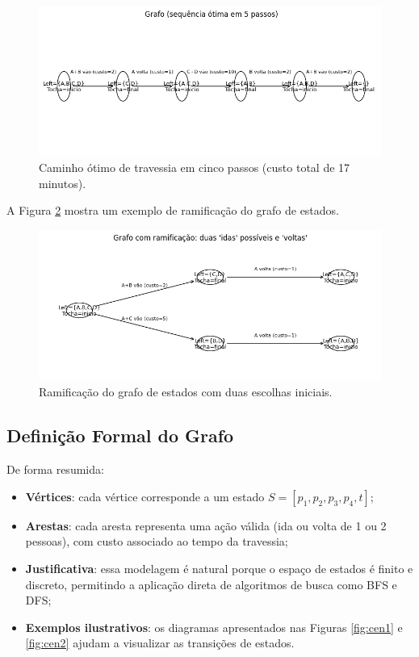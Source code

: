 \documentclass[12pt,a4paper]{article}
\begin{document}
\begin{figure}[H]
    \centering
    \includegraphics[width=0.8\linewidth]{optimal_path.png}
    \caption{Caminho ótimo de travessia em cinco passos (custo total de 17 minutos).}
    \label{fig:optimal_path}
\end{figure}

A Figura \ref{fig:ramification} mostra um exemplo de ramificação do grafo de estados.

\begin{figure}[H]
    \centering
    \includegraphics[width=0.8\linewidth]{ramification.png}
    \caption{Ramificação do grafo de estados com duas escolhas iniciais.}
    \label{fig:ramification}
\end{figure}

\subsection{Definição Formal do Grafo}
De forma resumida:
\begin{itemize}
\item \textbf{Vértices}: cada vértice corresponde a um estado $S = [p_1, p_2, p_3, p_4, t]$;
\item \textbf{Arestas}: cada aresta representa uma ação válida (ida ou volta de 1 ou 2 pessoas), com custo associado ao tempo da travessia;
\item \textbf{Justificativa}: essa modelagem é natural porque o espaço de estados é finito e discreto, permitindo a aplicação direta de algoritmos de busca como BFS e DFS;
\item \textbf{Exemplos ilustrativos}: os diagramas apresentados nas Figuras \ref{fig:cen1} e \ref{fig:cen2} ajudam a visualizar as transições de estados.
\end{itemize}
\end{document}
